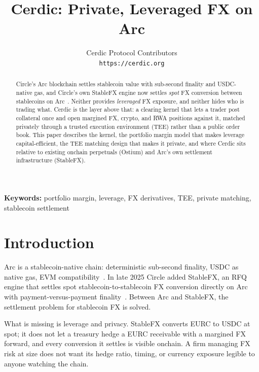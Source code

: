 \documentclass[11pt,a4paper]{article}
\title{
  \vspace{-1.5cm}
  \textbf{Cerdic: Private, Leveraged FX on Arc}
  \vspace{-0.3cm}
}
\author{
  Cerdic Protocol Contributors\\[4pt]
  \texttt{https://cerdic.org}
}
\date{}
\begin{document}
\maketitle
\thispagestyle{empty}

\vspace{0.3cm}

\begin{abstract}
  \noindent Circle's Arc blockchain settles stablecoin value with sub-second finality and USDC-native gas, and Circle's own StableFX engine now settles \emph{spot} FX conversion between stablecoins on Arc~\cite{circlearc, circle_stablefx}. Neither provides \emph{leveraged} FX exposure, and neither hides who is trading what. Cerdic is the layer above that: a clearing kernel that lets a trader post collateral once and open margined FX, crypto, and RWA positions against it, matched privately through a trusted execution environment (TEE) rather than a public order book. This paper describes the kernel, the portfolio margin model that makes leverage capital-efficient, the TEE matching design that makes it private, and where Cerdic sits relative to existing onchain perpetuals (Ostium) and Arc's own settlement infrastructure (StableFX).
\end{abstract}

\vspace{0.3cm}

\noindent\textbf{Keywords:} portfolio margin, leverage, FX derivatives, TEE, private matching, stablecoin settlement

\newpage
\tableofcontents
\newpage

\section{Introduction}
\label{sec:introduction}

Arc is a stablecoin-native chain: deterministic sub-second finality, USDC as native gas, EVM compatibility~\cite{circlearc, arc_technical}. In late 2025 Circle added StableFX, an RFQ engine that settles spot stablecoin-to-stablecoin FX conversion directly on Arc with payment-versus-payment finality~\cite{circle_stablefx}. Between Arc and StableFX, the settlement problem for stablecoin FX is solved.

What is missing is leverage and privacy. StableFX converts EURC to USDC at spot; it does not let a treasury hedge a EURC receivable with a margined FX forward, and every conversion it settles is visible onchain. A firm managing FX risk at size does not want its hedge ratio, timing, or currency exposure legible to anyone watching the chain.
\end{document}

